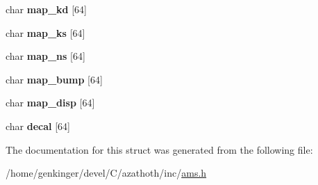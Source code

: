 \begin{DoxyCompactItemize}
char {\bfseries map\+\_\+kd} \mbox{[}64\mbox{]}
\item 
\mbox{\label{structams1__material__t_a008966bb65e109e97ee007116f4dc100}} 
char {\bfseries map\+\_\+ks} \mbox{[}64\mbox{]}
\item 
\mbox{\label{structams1__material__t_a9b70fd158a14b48a142c850a85b9c580}} 
char {\bfseries map\+\_\+ns} \mbox{[}64\mbox{]}
\item 
\mbox{\label{structams1__material__t_a88e4b881c8c4a10a44e4bf3722f9cd99}} 
char {\bfseries map\+\_\+bump} \mbox{[}64\mbox{]}
\item 
\mbox{\label{structams1__material__t_a723bc4d7682b07b252138053fa1de739}} 
char {\bfseries map\+\_\+disp} \mbox{[}64\mbox{]}
\item 
\mbox{\label{structams1__material__t_a676516b1adcf05e8095a2e1869bb04dc}} 
char {\bfseries decal} \mbox{[}64\mbox{]}
\end{DoxyCompactItemize}


The documentation for this struct was generated from the following file\+:\begin{DoxyCompactItemize}
\item 
/home/genkinger/devel/\+C/azathoth/inc/\mbox{\hyperlink{ams_8h}{ams.\+h}}\end{DoxyCompactItemize}
